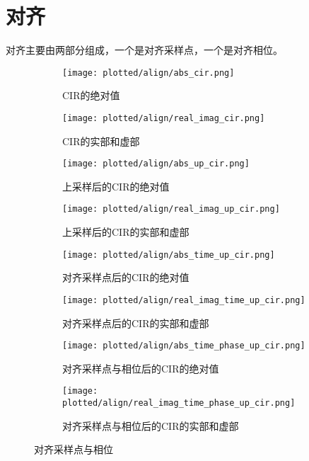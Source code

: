 \section{对齐}
对齐主要由两部分组成，一个是对齐采样点，一个是对齐相位。
\begin{figure}[htbp]
    \centering
    \begin{subfigure}{0.47\textwidth}
        \centering
        \texttt{[image: plotted/align/abs\_cir.png]}
        \caption{\label{fig:abs_cir}CIR的绝对值}
    \end{subfigure}%
    \begin{subfigure}{0.47\textwidth}
        \centering
        \texttt{[image: plotted/align/real\_imag\_cir.png]}
        \caption{\label{fig:real_imag_cir}CIR的实部和虚部}
    \end{subfigure}

    \begin{subfigure}{0.47\textwidth}
        \centering
        \texttt{[image: plotted/align/abs\_up\_cir.png]}
        \caption{\label{fig:abs_up_cir}上采样后的CIR的绝对值}
    \end{subfigure}
    \begin{subfigure}{0.47\textwidth}
        \centering
        \texttt{[image: plotted/align/real\_imag\_up\_cir.png]}
        \caption{\label{fig:real_imag_up_cir}上采样后的CIR的实部和虚部}
    \end{subfigure}%

    \begin{subfigure}{0.47\textwidth}
        \centering
        \texttt{[image: plotted/align/abs\_time\_up\_cir.png]}
        \caption{\label{fig:abs_time_up_cir}对齐采样点后的CIR的绝对值}
    \end{subfigure}
    \begin{subfigure}{0.47\textwidth}
        \centering
        \texttt{[image: plotted/align/real\_imag\_time\_up\_cir.png]}
        \caption{\label{fig:real_imag_time_up_cir}对齐采样点后的CIR的实部和虚部}
    \end{subfigure}

    \begin{subfigure}{0.47\textwidth}
        \centering
        \texttt{[image: plotted/align/abs\_time\_phase\_up\_cir.png]}
        \caption{\label{fig:abs_time_phase_up_cir}对齐采样点与相位后的CIR的绝对值}
    \end{subfigure}
    \begin{subfigure}{0.47\textwidth}
        \centering
        \texttt{[image: plotted/align/real\_imag\_time\_phase\_up\_cir.png]}
        \caption{\label{fig:real_imag_time_phase_up_cir}对齐采样点与相位后的CIR的实部和虚部}
    \end{subfigure}
    \caption{对齐采样点与相位}
    \label{fig:align}
\end{figure}

